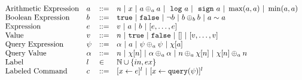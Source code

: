 \[
\begin{array}{llll}
%
%
\mbox{Arithmetic Expression} 
& \aexpr & ::= & 
n ~|~ {x} ~|~ \aexpr \oplus_a \aexpr 
~|~ \elog \aexpr ~|~ \esign \aexpr ~|~ \max(a, a) ~|~ \min(a, a)
\\
%
\mbox{Boolean Expression} & \bexpr & ::= & 
%
\etrue ~|~ \efalse ~|~ \neg \bexpr
 ~|~ \bexpr \oplus_b \bexpr
%
~|~ \aexpr \sim \aexpr 
\\
%
\mbox{Expression} & \expr & ::= & v ~|~ \aexpr ~|~ \bexpr ~|~ [\expr, \dots, \expr]
\\ 
%
\mbox{Value} 
& v & ::= & { n ~|~ \etrue ~|~ \efalse ~|~ [] ~|~ [v, \dots, v]} 
\\
%
\mbox{Query Expression} 
& {\qexpr} & ::= 
& { \qval ~|~ \aexpr ~|~ \qexpr \oplus_a \qexpr ~|~ \chi[\aexpr]} 
\\
%
\mbox{Query Value} & \qval & ::= 
& {n ~|~ \chi[n] ~|~ \qval \oplus_a \qval ~|~ n \oplus_a \chi[n]
 ~|~ \chi[n] \oplus_a n}\\
\mbox{Label} 
& l & \in & \mathbb{N} \cup \{in, ex\} \\
\mbox{Labeled Command} 
& {c} & ::= & [\assign {{x}}{ {\expr}}]^{l} ~|~ [\assign {{x} } {{\query(\qexpr)}}]^{l}

\end{array}\]
